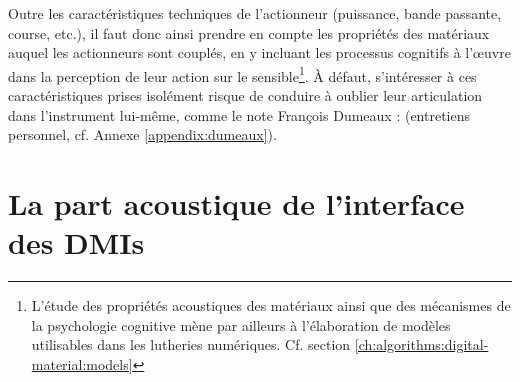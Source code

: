 \indent Outre les caractéristiques techniques de l'actionneur (puissance, bande passante, course, etc.), il faut donc ainsi prendre en compte les propriétés des matériaux auquel les actionneurs sont couplés, en y incluant les processus cognitifs à l'œuvre dans la perception de leur action sur le sensible\footnote{L'étude des propriétés acoustiques des matériaux ainsi que des mécanismes de la psychologie cognitive mène par ailleurs à l'élaboration de modèles utilisables dans les lutheries numériques. Cf. section \ref{ch:algorithms:digital-material:models}}. À défaut, s'intéresser à ces caractéristiques prises isolément risque de conduire à oublier leur articulation dans l'instrument lui-même, comme le note François Dumeaux :  (entretiens personnel, cf. Annexe \ref{appendix:dumeaux}).

\section{La part acoustique de l'interface des DMIs}
\label{sec:interfaces:part_acoustique}

